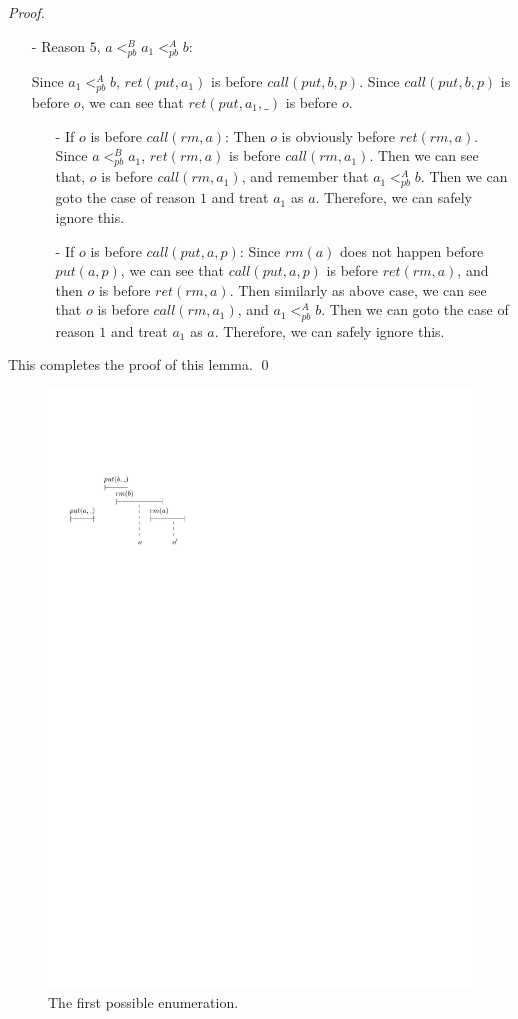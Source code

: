 \begin {proof}
\begin{itemize}
\item[-] Reason $5$, $a <_{\textit{pb}}^B a_1 <_{\textit{pb}}^A b$:

    Since $a_1 <_{\textit{pb}}^A b$, $\textit{ret}(\textit{put},a_1)$ is before $\textit{call}(\textit{put},b,p)$. Since $\textit{call}(\textit{put},b,p)$ is before $o$, we can see that $\textit{ret}(\textit{put},a_1,\_)$ is before $o$.

    \begin{itemize}
    \setlength{\itemsep}{0.5pt}
    \item[-] If $o$ is before $\textit{call}(\textit{rm},a)$: Then $o$ is obviously before $\textit{ret}(\textit{rm},a)$. Since $a <_{\textit{pb}}^B a_1$, $\textit{ret}(\textit{rm},a)$ is before $\textit{call}(\textit{rm},a_1)$. Then we can see that, $o$ is before $\textit{call}(\textit{rm},a_1)$, and remember that $a_1 <_{\textit{pb}}^A b$. Then we can goto the case of reason $1$ and treat $a_1$ as $a$. Therefore, we can safely ignore this.

    \item[-] If $o$ is before $\textit{call}(\textit{put},a,p)$: Since $\textit{rm}(a)$ does not happen before $\textit{put}(a,p)$, we can see that $\textit{call}(\textit{put},a,p)$ is before $\textit{ret}(\textit{rm},a)$, and then $o$ is before $\textit{ret}(\textit{rm},a)$. Then similarly as above case, we can see that $o$ is before $\textit{call}(\textit{rm},a_1)$, and $a_1 <_{\textit{pb}}^A b$. Then we can goto the case of reason $1$ and treat $a_1$ as $a$. Therefore, we can safely ignore this.
    \end{itemize}
\end{itemize}

This completes the proof of this lemma. \qed
\end {proof}

\begin{figure}[htbp]
  \centering
  \includegraphics[width=0.4 \textwidth]{figures/PIC-HIS-PQ1Equal-1.pdf}
  \caption{The first possible enumeration.}
  \label{fig:history enumeration 1 for PQ1Equal}
\end{figure}


